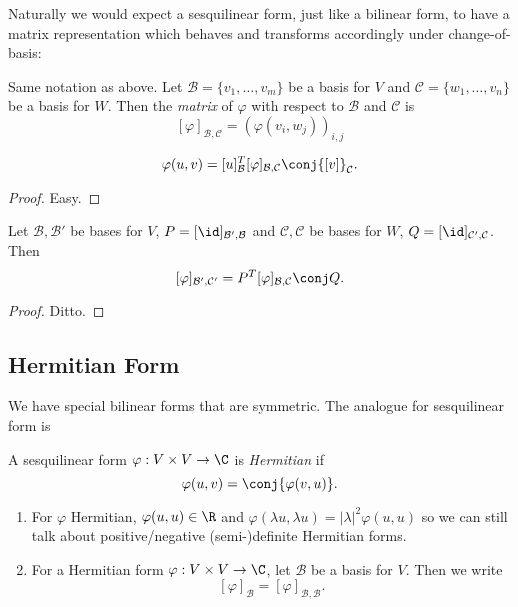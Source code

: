 \documentclass[a4paper]{article}
\newcommand*{\basis}{\mathcal}
\theoremstyle{definition}
\begin{document}
Naturally we would expect a sesquilinear form, just like a bilinear form, to have a matrix representation which behaves and transforms accordingly under change-of-basis:

\begin{definition}
  Same notation as above. Let \(\basis B = \{v_1, \dots, v_m\}\) be a basis for \(V\) and \(\basis C = \{w_1, \dots, v_n\}\) be a basis for \(W\). Then the \emph{matrix} of \(\varphi\) with respect to \(\basis B\) and \(\basis C\) is
  \[
    [\varphi]_{\basis B, \basis C} = \left(\varphi(v_i, w_j)\right)_{i,j}
  \]
\end{definition}

\begin{lemma}
  \[
    \varphi(u, v) = [u]_{\basis B}^T [\varphi]_{\basis B, \basis C} \conj{[v]}_{\basis C}.
  \]
\end{lemma}

\begin{proof}
  Easy.
\end{proof}

\begin{lemma}
  Let \(\basis B, \basis B'\) be bases for \(V\), \(P = [\id]_{\basis B', \basis B}\) and \(\basis C, \basis C\) be bases for \(W\), \(Q = [\id]_{\basis C', \basis C}\). Then
  \[
    [\varphi]_{\basis B', \basis C'} = P^T [\varphi]_{\basis B, \basis C} \conj Q.
  \]
\end{lemma}

\begin{proof}
  Ditto.
\end{proof}

\subsection{Hermitian Form}

We have special bilinear forms that are symmetric. The analogue for sesquilinear form is

\begin{definition}
  A sesquilinear form \(\varphi: V \times V \to \C\) is \emph{Hermitian} if
  \[
    \varphi(u, v) = \conj{\varphi(v,u)}.
  \]
\end{definition}

\begin{note}\leavevmode
  \begin{enumerate}
  \item For \(\varphi\) Hermitian, \(\varphi(u, u) \in \R\) and \(\varphi(\lambda u, \lambda u) = |\lambda|^2 \varphi(u,u)\) so we can still talk about positive/negative (semi-)definite Hermitian forms.
  \item For a Hermitian form \(\varphi: V \times V \to \C\), let \(\basis B\) be a basis for \(V\). Then we write
    \[
      [\varphi]_{\basis B} = [\varphi]_{\basis B, \basis B}.
    \]
  \end{enumerate}
\end{note}
\end{document}
